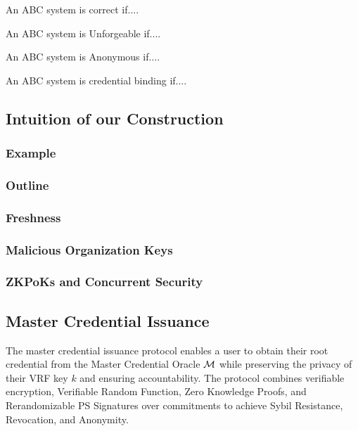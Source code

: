 \begin{definition}[Correctness]
    An ABC system is correct if....
\end{definition}
\begin{definition}[Unforgeability]
    An ABC system is Unforgeable if....
\end{definition}
\begin{definition}[Anonymous]
    An ABC system is Anonymous if....
\end{definition}
\begin{definition}
    An ABC system is credential binding if....
\end{definition}





\subsection{Intuition of our Construction}
\subsubsection{Example}
\subsubsection{Outline}
\subsubsection{Freshness}
\subsubsection{Malicious Organization Keys}
\subsubsection{ZKPoKs and Concurrent Security}





\newpage
\subsection{Master Credential Issuance}
The master credential issuance protocol enables a user to obtain their root credential from the Master Credential Oracle $\mathcal{M}$ while preserving the privacy of their VRF key $k$ and ensuring accountability. The protocol combines verifiable encryption, Verifiable Random Function, Zero Knowledge Proofs, and Rerandomizable PS Signatures over commitments to achieve Sybil Resistance, Revocation, and Anonymity.

